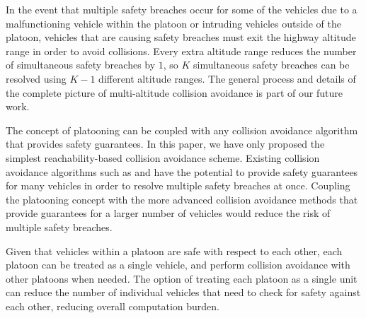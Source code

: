 In the event that multiple safety breaches occur for some of the vehicles due to a malfunctioning vehicle within the platoon or intruding vehicles outside of the platoon, vehicles that are causing safety breaches must exit the highway altitude range in order to avoid collisions. Every extra altitude range reduces the number of simultaneous safety breaches by $1$, so $K$ simultaneous safety breaches can be resolved using $K-1$ different altitude ranges. The general process and details of the complete picture of multi-altitude collision avoidance is part of our future work. 

The concept of platooning can be coupled with any collision avoidance algorithm that provides safety guarantees. In this paper, we have only proposed the simplest reachability-based collision avoidance scheme. Existing collision avoidance algorithms such as \cite{Bansal16} and \cite{Chen16} have the potential to provide safety guarantees for many vehicles in order to resolve multiple safety breaches at once. Coupling the platooning concept with the more advanced collision avoidance methods that provide guarantees for a larger number of vehicles would reduce the risk of multiple safety breaches.

Given that vehicles within a platoon are safe with respect to each other, each platoon can be treated as a single vehicle, and perform collision avoidance with other platoons when needed. The option of treating each platoon as a single unit can reduce the number of individual vehicles that need to check for safety against each other, reducing overall computation burden.
